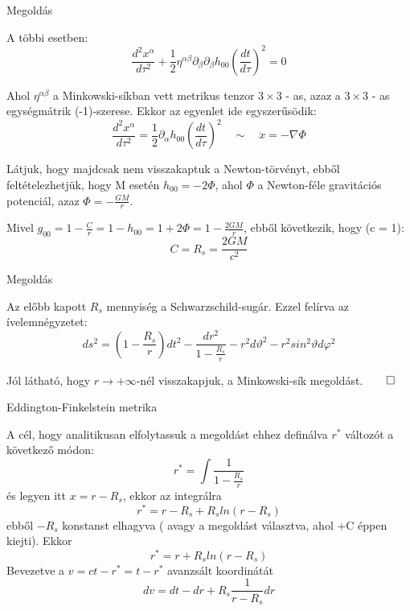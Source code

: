 \documentclass[10pt]{beamer}
\begin{document}
\begin{frame}[t]{Megoldás}
\par A többi esetben:
\begin{equation*}
\frac{d^{2}x^{\alpha}}{d\tau^{2}} + \frac{1}{2}\eta^{\alpha\beta}\partial_{\beta}\partial_{\beta}h_{00}(\frac{dt}{d\tau})^{2} = 0 
\end{equation*}
\par Ahol $\eta^{\alpha\beta}$ a Minkowski-síkban vett metrikus tenzor $3\times 3$ - as, azaz a $3 \times 3$ - as egységmátrik (-1)-szerese.
Ekkor az egyenlet ide egyszerűsödik:
\begin{equation*}
\frac{d^{2}x^{\alpha}}{d\tau^{2}} = \frac{1}{2}\partial_{\alpha}h_{00}(\frac{dt}{d\tau})^{2} \quad \sim \quad \ddot{x} = -\nabla \Phi
\end{equation*}
\par Látjuk, hogy majdcsak nem visszakaptuk a Newton-törvényt, ebből feltételezhetjük, hogy M esetén $h_{00} = -2\Phi$, ahol $\Phi$ a
Newton-féle gravitációs potenciál, azaz $\Phi = -\frac{GM}{r}$.
\vfill
\par Mivel $g_{00} = 1 - \frac{C}{r} = 1 - h_{00} = 1 + 2\Phi = 1 - \frac{2GM}{r}$, ebből következik, hogy (c = 1):
\begin{equation*}
C = R_{s} = \frac{2GM}{c^{2}}
\end{equation*} 
\end{frame}

\begin{frame}[t]{Megoldás}
\par Az előbb kapott $R_{s}$ mennyiség a Schwarzschild-sugár. Ezzel felírva az ívelemnégyzetet:
\begin{equation*}
ds^{2} = (1-\frac{R_{s}}{r})dt^{2} - \frac{dr^{2}}{1-\frac{R_{s}}{r}} - r^{2}d\vartheta^{2} - r^{2}sin^{2}\vartheta d\varphi^{2}
\end{equation*}
\par Jól látható, hogy $r \rightarrow +\infty$-nél visszakapjuk, a Minkowski-sík megoldást.$\qed$
\end{frame}

\begin{frame}[t]{Eddington-Finkelstein metrika}
\par A cél, hogy analitikusan elfolytassuk a megoldást ehhez definálva $r^{*}$ változót a következő módon:
$$r^{*}= \int \frac{1}{1 - \frac{R_{s}}{r}}$$
és legyen itt $x = r-R_{s}$, ekkor az integrálra $$r^{*} = r - R_{s} + R_{s}ln(r - R_{s})$$ 
ebből $-R_{s}$ konstanst elhagyva ( avagy a megoldást választva, ahol +C éppen kiejti). Ekkor $$ r^{*} = r + R_{s}ln(r - R_{s})$$
Bevezetve a $v = ct - r^{*} = t - r^{*}$ avanzsált koordinátát $$dv = dt - dr + R_{s}\frac{1}{r- R_{s}}dr$$
\end{frame}
\end{document}
